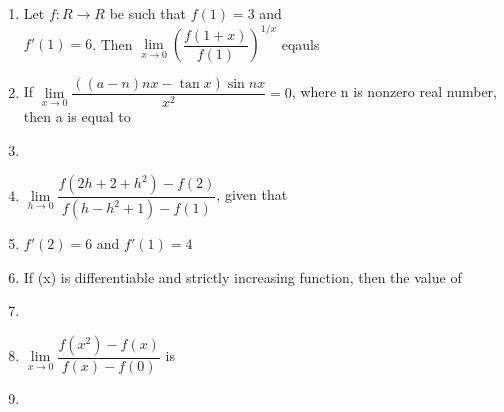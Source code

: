\documentclass[journal,12pt,twocolumn]{IEEEtran}
\begin{document}
\begin{enumerate}
\item Let $f:R \to R$ be such that $f(1)=3$ and \\$f'(1)=6$. Then $\lim\limits_{x \to 0}\left(\dfrac{f(1+x)}{f(1)}\right)^{1/x}$ eqauls \\
\begin{itemize}
\end{itemize}

\item If $\lim\limits_{x \to 0}\dfrac{((a-n)nx-\tan x)\sin nx}{x^2}=0$, where n is nonzero real number, then a is equal to
\begin{itemize}
\end{itemize}

\item[~] \item $\lim\limits_{h \to 0}\dfrac{f(2h+2+h^2)-f(2)}{f(h-h^2+1)-f(1)}$, given that \\ \item[~]$f'(2)=6$ and $f'(1)=4$
\begin{itemize}
\end{itemize}

\item If (x) is differentiable and strictly increasing function, then the value of \item[~] \item[~]$\lim\limits_{x \to 0}\dfrac{f(x^2)-f(x)}{f(x)-f(0)}$ is \item[~]
\begin{itemize}
\end{itemize}


\end{enumerate}
\end{document}
